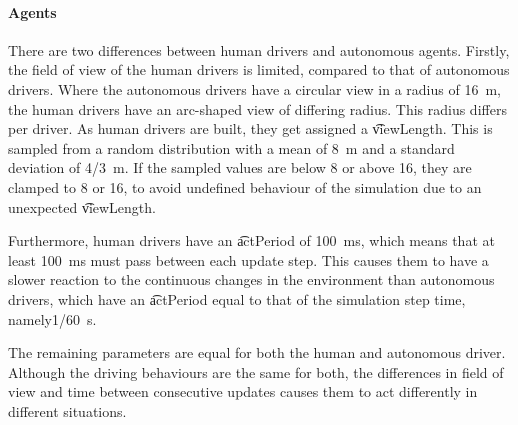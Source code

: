 

\paragraph{Agents}
There are two differences between human drivers and autonomous agents. Firstly, the field of view of the human drivers is limited, compared to that of autonomous drivers. Where the autonomous drivers have a circular view in a radius of \SI{16}{\meter}, the human drivers have an arc-shaped view of differing radius. This radius differs per driver. As human drivers are built, they get assigned a \t{viewLength}. This is sampled from a random distribution with a mean of \SI{8}{\meter} and a standard deviation of \SI{4/3}{\meter}. If the sampled values are below 8 or above 16, they are clamped to 8 or 16, to avoid undefined behaviour of the simulation due to an unexpected \t{viewLength}.

Furthermore, human drivers have an \t{actPeriod} of \SI{100}{\milli\second}, which means that at least \SI{100}{\milli\second} must pass between each update step. This causes them to have a slower reaction to the continuous changes in the environment than autonomous drivers, which have an \t{actPeriod} equal to that of the simulation step time, namely\SI{1/60}{\second}.

The remaining parameters are equal for both the human and autonomous driver. Although the driving behaviours are the same for both, the differences in field of view and time between consecutive updates causes them to act differently in different situations.




